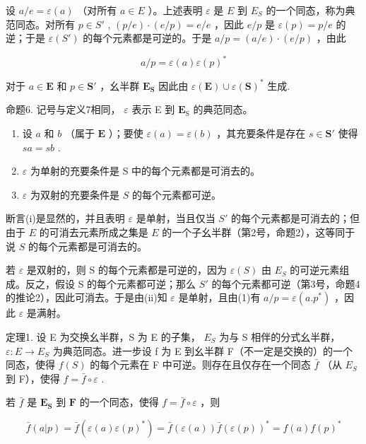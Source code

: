 设 \(a / e = \varepsilon(a)\) （对所有 \(a \in E\) ）。上述表明 \(\varepsilon\) 是 \(E\) 到 \(E_S\) 的一个同态，称为典范同态。对所有 \(p \in S'\) , \((p / e) \cdot (e / p) = e / e\) ，因此 \(e / p\) 是 \(\varepsilon(p) = p / e\) 的逆；于是 \(\varepsilon(S')\) 的每个元素都是可逆的。于是 \(a / p = (a / e) \cdot (e / p)\) ，由此

\[
a / p = \varepsilon (a) \varepsilon (p) ^ {*}\tag{1}
\]

对于 \(a \in \mathbf{E}\) 和 \(p \in \mathbf{S}'\) ，幺半群 \(\mathbf{E}_{\mathbf{S}}\) 因此由 \(\varepsilon(\mathbf{E}) \cup \varepsilon(\mathbf{S})^*\) 生成.

命题6. 记号与定义7相同， \(\varepsilon\) 表示 E 到 \(\mathbf{E}_{\mathrm{S}}\) 的典范同态。

\begin{enumerate}
\def\labelenumi{(\roman{enumi})}
\item
  设 \(a\) 和 \(b\) （属于 \(\mathbf{E}\) ）；要使 \(\varepsilon(a) = \varepsilon(b)\) ，其充要条件是存在 \(s \in \mathbf{S}'\) 使得 \(sa = sb\) .
\item
  \(\varepsilon\) 为单射的充要条件是 S 中的每个元素都是可消去的。
\item
  \(\varepsilon\) 为双射的充要条件是 \(S\) 的每个元素都可逆。
\end{enumerate}

断言(i)是显然的，并且表明 \(\varepsilon\) 是单射，当且仅当 \(S'\) 的每个元素都是可消去的；但由于 \(E\) 的可消去元素所成之集是 \(E\) 的一个子幺半群（第2号，命题2），这等同于说 \(S\) 的每个元素都是可消去的。

若 \(\varepsilon\) 是双射的，则 S 的每个元素都是可逆的，因为 \(\varepsilon(S)\) 由 \(E_{S}\) 的可逆元素组成。反之，假设 S 的每个元素都可逆；那么 \(S'\) 的每个元素都可逆（第3号，命题4的推论2），因此可消去。于是由(ii)知 \(\varepsilon\) 是单射，且由(1)有 \(a/p = \varepsilon(a.p^{*})\) ，因此 \(\varepsilon\) 是满射。

定理1. 设 E 为交换幺半群，S 为 E 的子集， \(E_{S}\) 为与 S 相伴的分式幺半群， \(\varepsilon: E \to E_{S}\) 为典范同态。进一步设 f 为 E 到幺半群 F（不一定是交换的）的一个同态，使得 \(f(S)\) 的每个元素在 F 中可逆。则存在且仅存在一个同态 \(\bar{f}\) （从 \(E_{S}\) 到 F），使得 \(f = \bar{f} \circ \varepsilon\) .

若 \(\bar{f}\) 是 \(\mathbf{E}_{\mathbf{S}}\) 到 \(\mathbf{F}\) 的一个同态，使得 \(f = \bar{f} \circ \varepsilon\) ，则

\[
\bar {f} (a | p) = \bar {f} (\varepsilon (a) \varepsilon (p) ^ {*}) = \bar {f} (\varepsilon (a)) \bar {f} (\varepsilon (p)) ^ {*} = f (a) f (p) ^ {*}
\]

